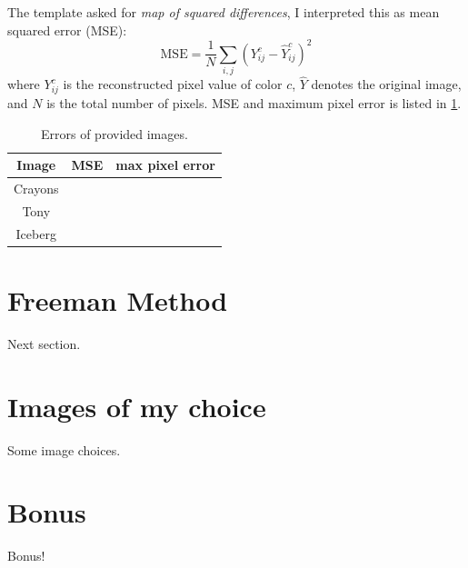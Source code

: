 \documentclass[12pt]{article}
\begin{document}
	The template asked for \textit{map of squared differences}, I interpreted this as mean squared error (MSE):
	\begin{equation*}
		\text{MSE} = \frac{1}{N} \sum_{i,j} (Y_{ij}^c - \hat{Y}_{ij}^c)^2
	\end{equation*}
	where $Y_{ij}^c$ is the reconstructed pixel value of color $c$, $\hat{Y}$ denotes the original image, and $N$ is the total number of pixels.
	MSE and maximum pixel error is listed in \cref{tab:errors-linear}.

	\begin{table}[h]
		\centering
		\caption{Errors of provided images.}
		\label{tab:errors-linear}
		\begin{tabular}{c|cc}
			\toprule
			Image & MSE & max pixel error \\
			\midrule
			Crayons & & \\
			Tony & & \\
			Iceberg & & \\
			\bottomrule
		\end{tabular}
	\end{table}

\section{Freeman Method}
	Next section.

\section{Images of my choice}
	Some image choices.

\section{Bonus}
	Bonus!
\end{document}
